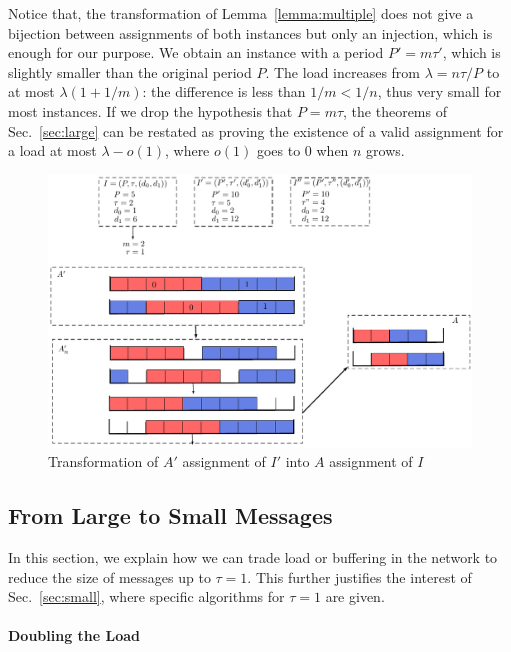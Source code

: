 \documentclass[a4paper,UKenglish,cleveref, autoref, thm-restate]{lipics-v2019}
\begin{document}
Notice that, the transformation of Lemma~\ref{lemma:multiple} does not give a bijection between assignments of both instances but only an injection, which is enough for our purpose. 
We obtain an instance with a period $P'= m\tau'$, which is slightly smaller than the original period $P$. The load increases from $\lambda = n \tau / P$ to at most $\lambda (1 + 1/m)$: the difference is less than $1/m < 1/n$, thus very small for most instances. If we drop the hypothesis that $P=m\tau$, the theorems of Sec.~\ref{sec:large} can be restated as proving the existence of a valid assignment for a load at most $\lambda - o(1)$, where $o(1)$ goes to $0$ when $n$ grows. 

\begin{figure}
 \begin{center}
\includegraphics[scale=0.75]{multipleperiod}
\end{center}
\caption{Transformation of $A'$ assignment of $I'$ into $A$ assignment of $I$}
\label{fig:multipleperiod}
\end{figure}

\subsection{From Large to Small Messages}\label{sec:reduction}


In this section, we explain how we can trade load or buffering in the network to reduce the size of messages up to $\tau = 1$. This further justifies the interest of Sec.~\ref{sec:small}, where specific algorithms for $\tau = 1$ are given.

\paragraph*{Doubling the Load}
\end{document}

